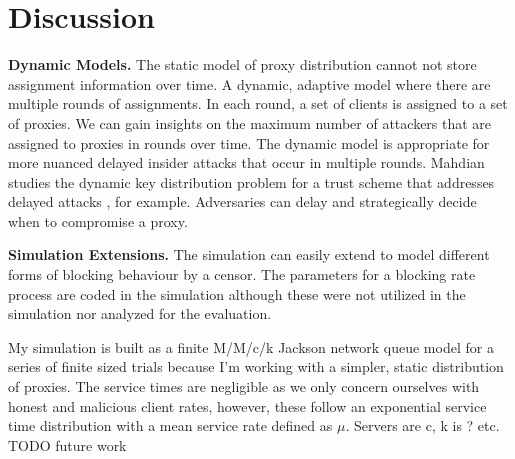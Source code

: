 \chapter{Discussion}
\label{sec:discussion}


\textbf{Dynamic Models.} The static model of proxy distribution cannot not store assignment information over time. A dynamic, adaptive model where there are multiple rounds of assignments. In each round, a set of clients is assigned to a set of proxies. We can gain insights on the maximum number of attackers that are assigned to proxies in rounds over time. The dynamic model is appropriate for more nuanced delayed insider attacks that occur in multiple rounds. Mahdian studies the dynamic key distribution problem for a trust scheme that addresses delayed attacks \cite{mahdian2010fighting}, for example. Adversaries can delay and strategically decide when to compromise a proxy.

\textbf{Simulation Extensions.} The simulation can easily extend to model different forms of blocking behaviour by a censor. The parameters for a blocking rate process are coded in the simulation although these were not utilized in the simulation nor analyzed for the evaluation.  

My simulation is built as a finite M/M/c/k Jackson network queue model for a series of finite sized trials because I'm working with a simpler, static distribution of proxies. The service times are negligible as we only concern ourselves with honest and malicious client rates, however, these follow an exponential service time distribution with a mean service rate defined as $\mu$. Servers are c, k is ? etc. TODO future work 


